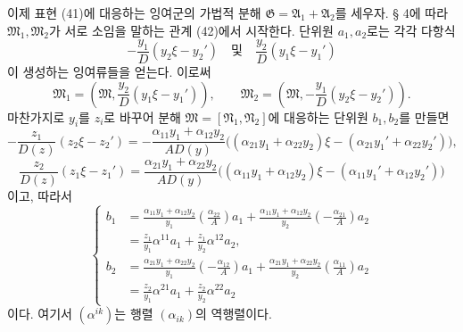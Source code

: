 이제 표현 (41)에 대응하는 잉여군의 가법적 분해 \(\mathfrak G=\mathfrak A_1+\mathfrak A_2\)를 세우자. § 4에 따라 \(\mathfrak M_1,\mathfrak M_2\)가 서로 소임을 말하는 관계 (42)에서 시작한다. 단위원 \(a_1,a_2\)로는 각각 다항식
\[
 -\frac{y_1}{D}(y_2\xi-y_2')
 \quad\text{및}\quad
 \frac{y_2}{D}(y_1\xi-y_1')
\]
이 생성하는 잉여류들을 얻는다. 이로써
\[
 \mathfrak M_1
 =\left(\mathfrak M,\frac{y_2}{D}(y_1\xi-y_1')\right),
 \qquad
 \mathfrak M_2
 =\left(\mathfrak M,-\frac{y_1}{D}(y_2\xi-y_2')\right).
\]
마찬가지로 \(y_i\)를 \(z_i\)로 바꾸어 분해 \(\mathfrak M=[\mathfrak N_1,\mathfrak N_2]\)에 대응하는 단위원 \(b_1,b_2\)를 만들면
\[
 -\frac{z_1}{D(z)}(z_2\xi-z_2')
 =-\frac{\alpha_{11}y_1+\alpha_{12}y_2}{AD(y)}
 \bigl((\alpha_{21}y_1+\alpha_{22}y_2)\xi
      -(\alpha_{21}y_1'+\alpha_{22}y_2')\bigr),
\]
\[
 \frac{z_2}{D(z)}(z_1\xi-z_1')
 =\frac{\alpha_{21}y_1+\alpha_{22}y_2}{AD(y)}
 \bigl((\alpha_{11}y_1+\alpha_{12}y_2)\xi
      -(\alpha_{11}y_1'+\alpha_{12}y_2')\bigr)
\]
이고, 따라서
\begin{equation}
\left\{
\begin{aligned}
 b_1&=\frac{\alpha_{11}y_1+\alpha_{12}y_2}{y_1}
 \left(\frac{\alpha_{22}}{A}\right)a_1
 +\frac{\alpha_{11}y_1+\alpha_{12}y_2}{y_2}
 \left(-\frac{\alpha_{21}}{A}\right)a_2\\
 &=\frac{z_1}{y_1}\alpha^{11}a_1
  +\frac{z_1}{y_2}\alpha^{12}a_2,\\
 b_2&=\frac{\alpha_{21}y_1+\alpha_{22}y_2}{y_1}
 \left(-\frac{\alpha_{12}}{A}\right)a_1
 +\frac{\alpha_{21}y_1+\alpha_{22}y_2}{y_2}
 \left(\frac{\alpha_{11}}{A}\right)a_2\\
 &=\frac{z_2}{y_1}\alpha^{21}a_1
  +\frac{z_2}{y_2}\alpha^{22}a_2
\end{aligned}\right.
\tag{43}
\end{equation}
이다. 여기서 \((\alpha^{ik})\)는 행렬 \((\alpha_{ik})\)의 역행렬이다.


